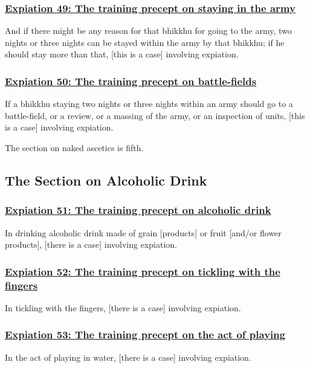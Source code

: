 \subsubsection*{\hyperref[pac49]{Expiation 49: The training precept on staying in the army}}
\label{exp49}
And if there might be any reason for that bhikkhu for going to the army, two nights or three nights can be stayed within the army by that bhikkhu; if he should stay more than that, [this is a case] involving expiation.

\subsubsection*{\hyperref[pac50]{Expiation 50: The training precept on battle-fields}}
\label{exp50}
If a bhikkhu staying two nights or three nights within an army should go to a battle-field, or a review, or a massing of the army, or an inspection of units, [this is a case] involving expiation.

The section on naked ascetics is fifth.

\setsubsecheadstyle{\subsectionFmt}
\subsection{The Section on Alcoholic Drink}
\vspace{0.2cm}

\subsubsection*{\hyperref[pac51]{Expiation 51: The training precept on alcoholic drink}}
\label{exp51}
In drinking alcoholic drink made of grain [products] or fruit [and/or flower products], [there is a case] involving expiation.

\subsubsection*{\hyperref[pac52]{Expiation 52: The training precept on tickling with the fingers}}
\label{exp52}
In tickling with the fingers, [there is a case] involving expiation.

\subsubsection*{\hyperref[pac53]{Expiation 53: The training precept on the act of playing}}
\label{exp53}
In the act of playing in water, [there is a case] involving expiation.

